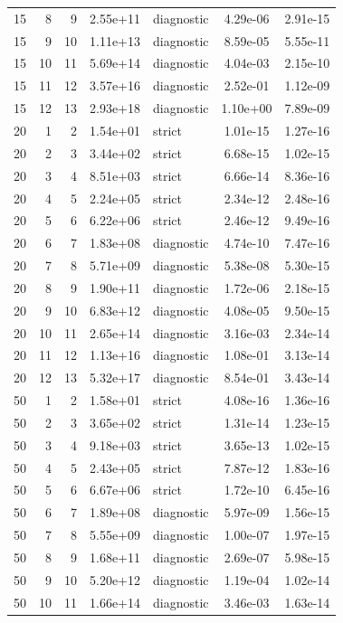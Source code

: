 \begin{longtable}{r r r S[table-format=1.2e-2] l S[table-format=1.2e-2] S[table-format=1.2e-2]}
15 & 8 & 9 & 2.55e+11 & diagnostic & 4.29e-06 & 2.91e-15 \\
15 & 9 & 10 & 1.11e+13 & diagnostic & 8.59e-05 & 5.55e-11 \\
15 & 10 & 11 & 5.69e+14 & diagnostic & 4.04e-03 & 2.15e-10 \\
15 & 11 & 12 & 3.57e+16 & diagnostic & 2.52e-01 & 1.12e-09 \\
15 & 12 & 13 & 2.93e+18 & diagnostic & 1.10e+00 & 7.89e-09 \\
20 & 1 & 2 & 1.54e+01 & strict & 1.01e-15 & 1.27e-16 \\
20 & 2 & 3 & 3.44e+02 & strict & 6.68e-15 & 1.02e-15 \\
20 & 3 & 4 & 8.51e+03 & strict & 6.66e-14 & 8.36e-16 \\
20 & 4 & 5 & 2.24e+05 & strict & 2.34e-12 & 2.48e-16 \\
20 & 5 & 6 & 6.22e+06 & strict & 2.46e-12 & 9.49e-16 \\
20 & 6 & 7 & 1.83e+08 & diagnostic & 4.74e-10 & 7.47e-16 \\
20 & 7 & 8 & 5.71e+09 & diagnostic & 5.38e-08 & 5.30e-15 \\
20 & 8 & 9 & 1.90e+11 & diagnostic & 1.72e-06 & 2.18e-15 \\
20 & 9 & 10 & 6.83e+12 & diagnostic & 4.08e-05 & 9.50e-15 \\
20 & 10 & 11 & 2.65e+14 & diagnostic & 3.16e-03 & 2.34e-14 \\
20 & 11 & 12 & 1.13e+16 & diagnostic & 1.08e-01 & 3.13e-14 \\
20 & 12 & 13 & 5.32e+17 & diagnostic & 8.54e-01 & 3.43e-14 \\
50 & 1 & 2 & 1.58e+01 & strict & 4.08e-16 & 1.36e-16 \\
50 & 2 & 3 & 3.65e+02 & strict & 1.31e-14 & 1.23e-15 \\
50 & 3 & 4 & 9.18e+03 & strict & 3.65e-13 & 1.02e-15 \\
50 & 4 & 5 & 2.43e+05 & strict & 7.87e-12 & 1.83e-16 \\
50 & 5 & 6 & 6.67e+06 & strict & 1.72e-10 & 6.45e-16 \\
50 & 6 & 7 & 1.89e+08 & diagnostic & 5.97e-09 & 1.56e-15 \\
50 & 7 & 8 & 5.55e+09 & diagnostic & 1.00e-07 & 1.97e-15 \\
50 & 8 & 9 & 1.68e+11 & diagnostic & 2.69e-07 & 5.98e-15 \\
50 & 9 & 10 & 5.20e+12 & diagnostic & 1.19e-04 & 1.02e-14 \\
50 & 10 & 11 & 1.66e+14 & diagnostic & 3.46e-03 & 1.63e-14 \\

\end{longtable}
